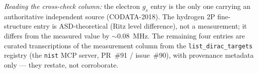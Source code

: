 \noindent\textit{Reading the cross-check column:}
the electron $g_s$ entry is the only one carrying an authoritative
independent source (CODATA-2018). The hydrogen 2P fine-structure entry is
ASD-theoretical (Ritz level difference), not a measurement; it differs from
the measured value by $\sim 0.08$~MHz. The remaining four entries are
curated transcriptions of the measurement column from the
\texttt{list\_dirac\_targets} registry (the \texttt{nist} MCP server, PR~\#91
/ issue~\#90), with provenance metadata only --- they restate, not corroborate.
